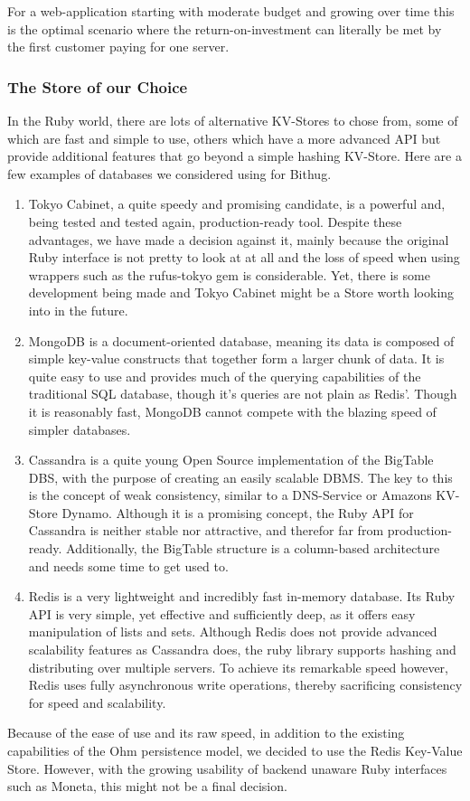 For a web-application starting with
moderate budget and growing over time this is the optimal scenario where the 
return-on-investment can literally be met by the first customer paying for one 
server.

\subsubsection{The Store of our Choice}
In the Ruby world, there are lots of alternative KV-Stores to chose from, some of which 
are fast and simple to use, others which have a more advanced API but provide 
additional features that go beyond a simple hashing KV-Store. Here are a few 
examples of databases we considered using for Bithug.
\begin{enumerate}
  \item
    Tokyo Cabinet, a quite speedy\cite{tcbench} and promising candidate, 
    is a powerful and, being tested and tested again, production-ready tool.
    Despite these advantages, we have made a decision against it, mainly because 
    the original Ruby interface is not pretty to look at at all and the loss of 
    speed when using wrappers such as the rufus-tokyo gem is considerable. 
    Yet, there is some development being made and Tokyo Cabinet might be a 
    Store worth looking into in the future.
  \item
    MongoDB is a document-oriented database, meaning its data is composed of simple 
    key-value constructs that together form a larger chunk of data. It is quite 
    easy to use and provides much of the querying capabilities of the traditional 
    SQL database, though it's queries are not plain as Redis'. Though it is 
    reasonably fast, MongoDB cannot compete with the blazing speed of simpler 
    databases.
  \item
    Cassandra is a quite young Open Source implementation of the BigTable DBS\cite{chang2006bigtable}, 
    with the purpose of creating an easily scalable DBMS. The key to this is 
    the concept of weak consistency, similar to a DNS-Service or 
    Amazons KV-Store Dynamo\cite{decandia2007dynamo}.
    Although it is a promising concept, the Ruby API for Cassandra is neither stable 
    nor attractive, and therefor far from production-ready. Additionally, the 
    BigTable structure is a column-based architecture and needs some time to get 
    used to.
  \item
    Redis is a very lightweight and incredibly fast\cite{haines2009redis} 
    in-memory database. Its Ruby API is very simple, yet effective and 
    sufficiently deep, as it offers easy manipulation of lists and sets. 
    Although Redis does not provide advanced scalability features as Cassandra 
    does, the ruby library supports hashing and distributing over multiple 
    servers. To achieve its remarkable speed however, Redis uses fully 
    asynchronous write operations, thereby sacrificing consistency for speed 
    and scalability.
\end{enumerate}

Because of the ease of use and its raw speed, in addition to the existing 
capabilities of the Ohm persistence model, we decided to use the Redis 
Key-Value Store. However, with the growing usability of backend unaware Ruby 
interfaces such as Moneta, this might not be a final decision.
